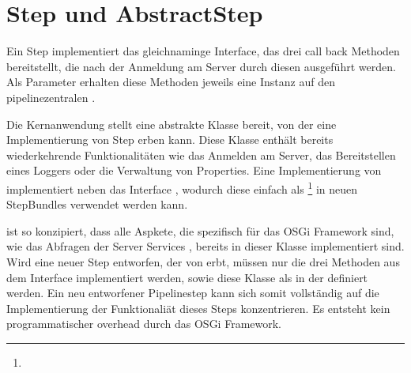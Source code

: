 \section{Step und AbstractStep}
Ein Step implementiert das gleichnaminge Interface, das drei call back
Methoden bereitstellt, die nach der Anmeldung am Server durch diesen ausgeführt
werden.
Als Parameter erhalten diese Methoden jeweils eine Instanz auf den
pipelinezentralen .


Die Kernanwendung  stellt eine abstrakte Klasse bereit, von der
eine Implementierung von Step erben kann.
Diese Klasse enthält bereits wiederkehrende Funktionalitäten wie das
Anmelden am Server, das Bereitstellen eines Loggers oder die Verwaltung von
Properties.
Eine Implementierung von  implementiert neben  das
Interface , wodurch diese einfach als
\footnote{}
in neuen StepBundles verwendet werden kann.

 ist so konzipiert, dass alle Aspkete, die spezifisch für
das OSGi Framework sind, wie das Abfragen der Server Services ,
bereits in dieser Klasse implementiert sind.
Wird eine neuer Step entworfen, der von  erbt, müssen nur
die drei Methoden aus dem Interface  implementiert werden, sowie
diese Klasse als   in der
 definiert werden.
Ein neu entworfener Pipelinestep  kann sich somit vollständig auf
die Implementierung der Funktionaliät dieses Steps konzentrieren.
Es entsteht kein programmatischer overhead  durch das OSGi
Framework. 
